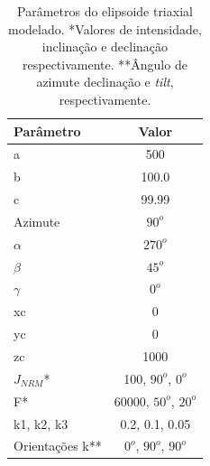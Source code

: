 \begin{table}[h]
	\begin{center}
		\begin{tabular}{|l|c|}
			\hline
			\textbf{Parâmetro}  & \textbf{Valor}  \\
			\hline 
			a   & 500 \\
			\hline
			b   & 100.0  \\
			\hline
			c   & 99.99 \\
			\hline
			Azimute   & $90^o$ \\
			\hline
			$\alpha$    & $270^o$   \\
			\hline
			$\beta$    & $45^o$ \\
			\hline
			$\gamma$   & $0^o$  \\
			\hline
			xc   & 0  \\
			\hline          
			yc   & 0  \\
			\hline                
			zc   & 1000  \\
			\hline
			$J_{NRM}$*  & 100, $90^o$, $0^o$  \\
			\hline
			F*    & 60000, $50^o$, $20^o$ \\
			\hline
			k1, k2, k3   & 0.2, 0.1, 0.05  \\
			\hline
			Orientações k**   & $0^o$, $90^o$, $90^o$  \\
			\hline
		\end{tabular}
		\caption{Parâmetros do elipsoide triaxial modelado. *Valores de intensidade, inclinação e declinação respectivamente. **Ângulo de azimute
			declinação e \textit{tilt}, respectivamente.}
	\end{center}
	\label{tab:triaxial_prolate1}
\end{table}

